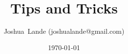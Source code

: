 \documentclass[12pt]{article}
\begin{document}
\title{Tips and Tricks}
\date{\today}
\author{Joshua~Lande (joshualande@gmail.com)}
\maketitle


\end{document}
